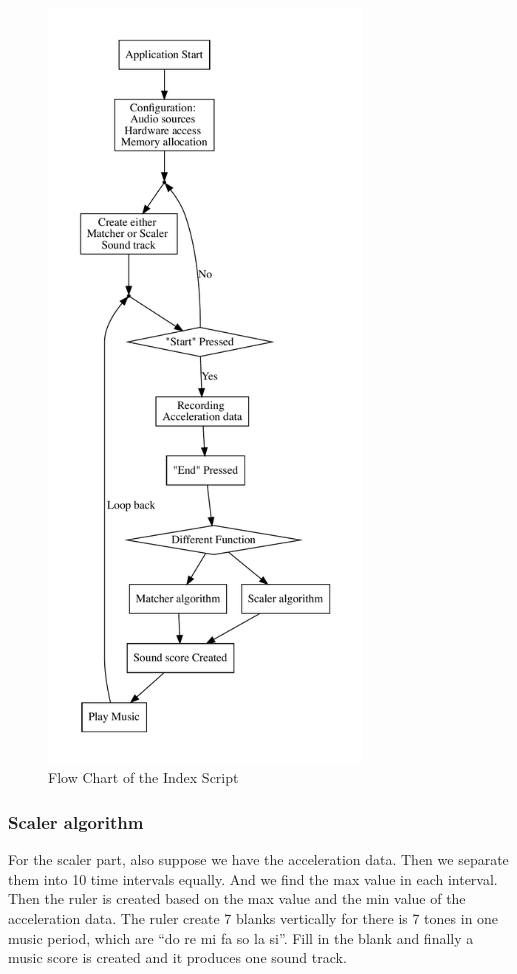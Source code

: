 \begin{figure}[H]
\centering
\includegraphics[height=20cm]{figWR/a}
\caption{Flow Chart of the Index Script}
\label{indexScript}
\end{figure}

\subsubsection{Scaler algorithm}

   For the scaler part, also suppose we have the acceleration data.
   Then we separate them into 10 time intervals equally.
   And we find the max value in each interval.
   Then the ruler is created based on the max value and the min value of the
   acceleration data.
   The ruler create 7 blanks vertically for there is 7 tones in one music
   period, which are ``do re mi fa so la si''.
   Fill in the blank and finally a music score is created and it produces one
   sound track.


